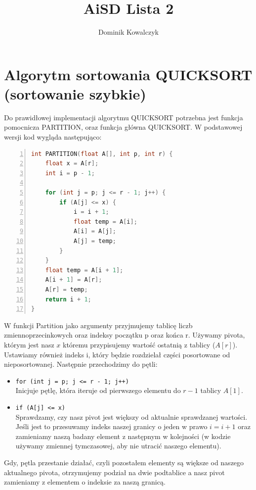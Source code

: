 \documentclass{article}
\title{AiSD Lista 2}
\author{Dominik Kowalczyk}
\begin{document}
	\maketitle

\section{Algorytm sortowania QUICKSORT (sortowanie szybkie)}

\large{Do prawidłowej implementacji algorytmu QUICKSORT potrzebna jest funkcja pomocnicza PARTITION, oraz funkcja główna QUICKSORT. W podstawowej wersji kod wygląda następująco:}
\\

\begin{lstlisting}[language=C++, caption={Kod funkcji sortowania szybkiego}, numbers=left, frame=single, xleftmargin=20pt]
int PARTITION(float A[], int p, int r) {
	float x = A[r];
	int i = p - 1;
	
	for (int j = p; j <= r - 1; j++) {
		if (A[j] <= x) {
			i = i + 1;
			float temp = A[i];
			A[i] = A[j];
			A[j] = temp;
		}
	}
	float temp = A[i + 1];
	A[i + 1] = A[r];
	A[r] = temp;
	return i + 1;
}
\end{lstlisting}

\large{W funkcji Partition jako argumenty przyjmujemy tablicę liczb zmiennoprzecinkowych oraz indeksy początku p oraz końca r. Używamy pivota, którym jest nasz \(x\) któremu przypisujemy wartość ostatnią z tablicy (\(A[r]\)). Ustawiamy również indeks i, który będzie rozdzielał części posortowane od nieposortowanej. Następnie przechodzimy do pętli:}

\begin{itemize}
\item \texttt{for (int j = p; j <= r - 1; j++)} \\
Inicjuje pętlę, która iteruje od pierwszego elementu do $r -1$ tablicy $A[1]$. \\


\item \texttt{if (A[j] <= x)} \\
Sprawdzamy, czy nasz pivot jest większy od aktualnie sprawdzanej wartości. Jeśli jest to przesuwamy indeks naszej granicy o jeden w prawo  $i=i+1$ oraz zamieniamy naszą badany element z następnym w kolejności (w kodzie używamy zmiennej tymczasowej, aby nie utracić naszego elementu).
\end{itemize}

\large{Gdy, pętla przestanie działać, czyli pozostałem elementy są większe od naszego aktualnego pivota, otrzymujemy podział na dwie podtablice a nasz pivot zamieniamy z elementem o indeksie za naszą granicą.}
\\
\end{document}
